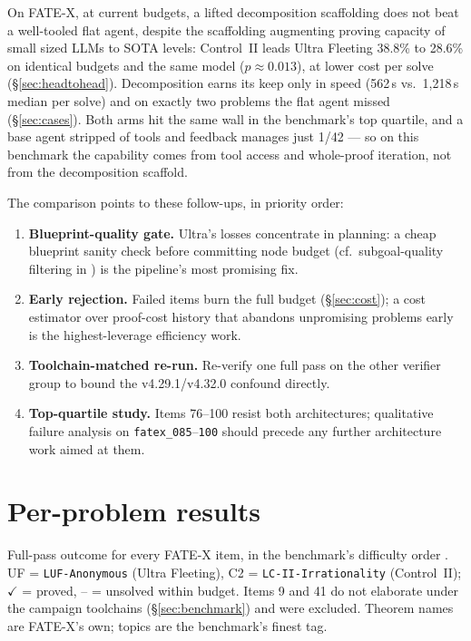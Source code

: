 \documentclass[12pt, a4paper]{article}
\newcommand{\run}[1]{\texttt{#1}}
\newcommand{\cmark}{$\checkmark$}
\begin{document}
On FATE-X, at current budgets, a lifted decomposition scaffolding does not beat a well-tooled flat
agent, despite the scaffolding augmenting proving capacity of small sized LLMs to SOTA levels: Control~II leads Ultra Fleeting 38.8\% to 28.6\% on identical budgets and
the same model ($p\approx0.013$), at lower cost per solve
(\S\ref{sec:headtohead}). Decomposition earns its keep only in speed (562\,s
vs.\ 1{,}218\,s median per solve) and on exactly two problems the flat agent
missed (\S\ref{sec:cases}). Both arms hit the same wall in the benchmark's top
quartile, and a base agent stripped of tools and feedback manages just 1/42 ---
so on this benchmark the capability comes from tool access and whole-proof
iteration, not from the decomposition scaffold.

The comparison points to these follow-ups, in priority order:

\begin{enumerate}[itemsep=2pt]
\item \textbf{Blueprint-quality gate.} Ultra's losses concentrate in planning:
      a cheap blueprint sanity check before committing node budget (cf.\
      subgoal-quality filtering in \cite{deepseekproverv2}) is the pipeline's
      most promising fix.
\item \textbf{Early rejection.} Failed items burn the full budget
      (\S\ref{sec:cost}); a cost estimator over proof-cost history that abandons
      unpromising problems early is the highest-leverage efficiency work.
\item \textbf{Toolchain-matched re-run.} Re-verify one full pass on the other
      verifier group to bound the v4.29.1/v4.32.0 confound directly.
\item \textbf{Top-quartile study.} Items 76--100 resist both architectures;
      qualitative failure analysis on \run{fatex\_085}--\run{100} should
      precede any further architecture work aimed at them.
\end{enumerate}

\newpage
\printbibliography

\newpage
\appendix
\section{Per-problem results}
\label{app:items}

Full-pass outcome for every FATE-X item, in the benchmark's difficulty order
\cite{fatex2025}. UF = \run{LUF-Anonymous} (Ultra Fleeting), C2 =
\run{LC-II-Irrationality} (Control~II); \cmark{} = proved, -- = unsolved
within budget. Items 9 and 41 do not elaborate under the campaign toolchains
(\S\ref{sec:benchmark}) and were excluded. Theorem names are FATE-X's own;
topics are the benchmark's finest tag.
\end{document}
